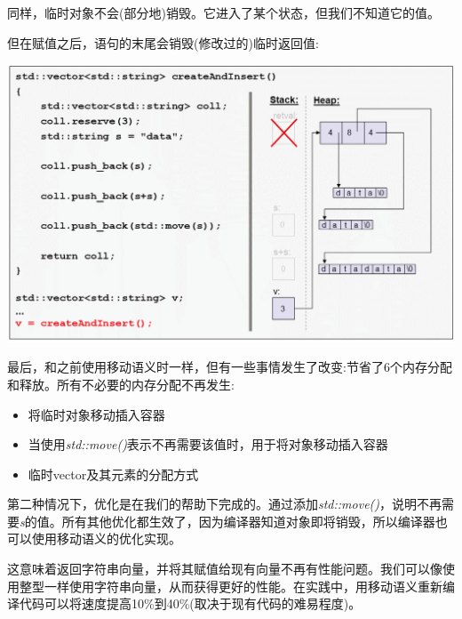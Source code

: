 \begin{itemize}
\begin{center}
	\end{center}
	同样，临时对象不会(部分地)销毁。它进入了某个状态，但我们不知道它的值。\par
	但在赋值之后，语句的末尾会销毁(修改过的)临时返回值:\par
	\begin{center}
		\includegraphics[width=1.0\textwidth]{content/1/chapter1/images/17}
	\end{center}
\end{itemize}

最后，和之前使用移动语义时一样，但有一些事情发生了改变:节省了6个内存分配和释放。所有不必要的内存分配不再发生:\par

\begin{itemize}
	\item 将临时对象移动插入容器
	\item 当使用\textit{std::move()}表示不再需要该值时，用于将对象移动插入容器
	\item 临时vector及其元素的分配方式
\end{itemize}

第二种情况下，优化是在我们的帮助下完成的。通过添加\textit{std::move()}，说明不再需要\textit{s}的值。所有其他优化都生效了，因为编译器知道对象即将销毁，所以编译器也可以使用移动语义的优化实现。\par

这意味着返回字符串向量，并将其赋值给现有向量不再有性能问题。我们可以像使用整型一样使用字符串向量，从而获得更好的性能。在实践中，用移动语义重新编译代码可以将速度提高10\%到40\%(取决于现有代码的难易程度)。\par


























